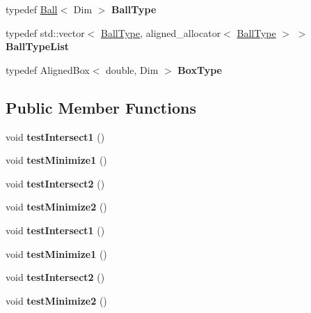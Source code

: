 \begin{DoxyCompactItemize}
\item 
\mbox{\label{struct_tree_test_a38858d8e8591e5807d8d92338842e741}} 
typedef \hyperlink{struct_ball}{Ball}$<$ Dim $>$ {\bfseries Ball\+Type}
\item 
\mbox{\label{struct_tree_test_abf836427b2c6d69c71462728ce8ba8ff}} 
typedef std\+::vector$<$ \hyperlink{struct_ball}{Ball\+Type}, aligned\+\_\+allocator$<$ \hyperlink{struct_ball}{Ball\+Type} $>$ $>$ {\bfseries Ball\+Type\+List}
\item 
\mbox{\label{struct_tree_test_a508b077c034bd084702e6c97cfb1a095}} 
typedef Aligned\+Box$<$ double, Dim $>$ {\bfseries Box\+Type}
\end{DoxyCompactItemize}
\subsection*{Public Member Functions}
\begin{DoxyCompactItemize}
\item 
\mbox{\label{struct_tree_test_abbaf1b857e67285db929b94d5c167afd}} 
void {\bfseries test\+Intersect1} ()
\item 
\mbox{\label{struct_tree_test_a1aa0748c7d0e35dee63516f8925d9dff}} 
void {\bfseries test\+Minimize1} ()
\item 
\mbox{\label{struct_tree_test_ace4937435404acc7cea44aba0e6234cf}} 
void {\bfseries test\+Intersect2} ()
\item 
\mbox{\label{struct_tree_test_afe91f44df0d579722f1a94b03aa393f0}} 
void {\bfseries test\+Minimize2} ()
\item 
\mbox{\label{struct_tree_test_abbaf1b857e67285db929b94d5c167afd}} 
void {\bfseries test\+Intersect1} ()
\item 
\mbox{\label{struct_tree_test_a1aa0748c7d0e35dee63516f8925d9dff}} 
void {\bfseries test\+Minimize1} ()
\item 
\mbox{\label{struct_tree_test_ace4937435404acc7cea44aba0e6234cf}} 
void {\bfseries test\+Intersect2} ()
\item 
\mbox{\label{struct_tree_test_afe91f44df0d579722f1a94b03aa393f0}} 
void {\bfseries test\+Minimize2} ()
\end{DoxyCompactItemize}



